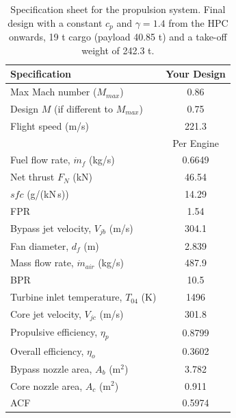 \begin{table}[H]
\centering
\begin{tabular}{l c}
\toprule
Specification & Your Design \\
\midrule
Max Mach number ($M_{max}$)                   & 0.86 \\
Design $M$ (if different to $M_{max}$)        & 0.75 \\
Flight speed (m/s)                            & 221.3 \\
\midrule
 & Per Engine \\
\midrule
Fuel flow rate, $\dot{m}_f$ (kg/s)            & 0.6649 \\
Net thrust $F_N$ (kN)                         & 46.54 \\
$sfc$ (g/(kN\,s))                             & 14.29 \\
FPR                                           & 1.54 \\
Bypass jet velocity, $V_{jb}$ (m/s)           & 304.1 \\
Fan diameter, $d_f$ (m)                       & 2.839 \\
Mass flow rate, $\dot{m}_{air}$ (kg/s)        & 487.9 \\
BPR                                           & 10.5 \\
Turbine inlet temperature, $T_{04}$ (K)       & 1496 \\
Core jet velocity, $V_{jc}$ (m/s)             & 301.8 \\
Propulsive efficiency, $\eta_p$               & 0.8799 \\
Overall efficiency, $\eta_o$                  & 0.3602 \\
Bypass nozzle area, $A_b$ (m$^2$)             & 3.782 \\
Core nozzle area, $A_c$ (m$^2$)               & 0.911 \\
ACF                                           & 0.5974 \\
\bottomrule
\end{tabular}
\caption{Specification sheet for the propulsion system. Final design with a constant $c_p$ and $\gamma = 1.4$ from the HPC
onwards, 19 t cargo (payload 40.85 t) and a take-off weight of 242.3 t.}
\label{tab:final_design}
\end{table}
